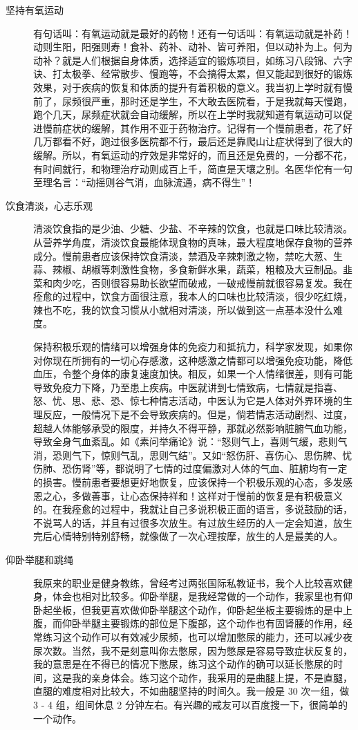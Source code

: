 \begin{description}
    \item[坚持有氧运动] 有句话叫：有氧运动就是最好的药物！还有一句话叫：有氧运动就是补药！动则生阳，阳强则寿！食补、药补、动补、皆可养阳，但以动补为上。何为动补？就是人们根据自身体质，选择适宜的锻炼项目，如练习八段锦、六字诀、打太极拳、经常散步、慢跑等，不会搞得太累，但又能起到很好的锻炼效果，对于疾病的恢复和体质的提升有着积极的意义。我当初上学时就有慢前了，尿频很严重，那时还是学生，不大敢去医院看，于是我就每天慢跑，跑个几天，尿频症状就会自动缓解，所以在上学时我就知道有氧运动可以促进慢前症状的缓解，其作用不亚于药物治疗。记得有一个慢前患者，花了好几万都看不好，跑过很多医院都不行，最后还是靠爬山让症状得到了很大的缓解。所以，有氧运动的疗效是非常好的，而且还是免费的，一分都不花，有时间就行，和物理治疗动则成百上千，简直是天壤之别。名医华佗有一句至理名言：“动摇则谷气消，血脉流通，病不得生”！
    \item[饮食清淡，心志乐观] 清淡饮食指的是少油、少糖、少盐、不辛辣的饮食，也就是口味比较清淡。从营养学角度，清淡饮食最能体现食物的真味，最大程度地保存食物的营养成分。慢前患者应该保持饮食清淡，禁酒及辛辣刺激之物，禁吃大葱、生蒜、辣椒、胡椒等刺激性食物，多食新鲜水果，蔬菜，粗粮及大豆制品。韭菜和肉少吃，否则很容易助长欲望而破戒，一破戒慢前就很容易复发。我在痊愈的过程中，饮食方面很注意，我本人的口味也比较清淡，很少吃红烧，辣也不吃，我的饮食习惯从小就相对清淡，所以做到这一点基本没什么难度。

    保持积极乐观的情绪可以增强身体的免疫力和抵抗力，科学家发现，如果你对你现在所拥有的一切心存感激，这种感激之情都可以增强免疫功能，降低血压，令整个身体的康复速度加快。相反，如果一个人情绪很差，则有可能导致免疫力下降，乃至患上疾病。中医就讲到七情致病，七情就是指喜、怒、忧、思、悲、恐、惊七种情志活动，中医认为它是人体对外界环境的生理反应，一般情况下是不会导致疾病的。但是，倘若情志活动剧烈、过度，超越人体能够承受的限度，并持久不得平静，那就必然影响脏腑气血功能，导致全身气血紊乱。如《素问举痛论》说：“怒则气上，喜则气缓，悲则气消，恐则气下，惊则气乱，思则气结”。又如“怒伤肝、喜伤心、思伤脾、忧伤肺、恐伤肾”等，都说明了七情的过度偏激对人体的气血、脏腑均有一定的损害。慢前患者要想更好地恢复，应该保持一个积极乐观的心态，多发感恩之心，多做善事，让心态保持祥和！这样对于慢前的恢复是有积极意义的。在我痊愈的过程中，我就让自己多说积极正面的语言，多说鼓励的话，不说骂人的话，并且有过很多次放生。有过放生经历的人一定会知道，放生完后心情特别特别舒畅，就像做了一次心理按摩，放生的人是最美的人。
    \item[仰卧举腿和跳绳] 我原来的职业是健身教练，曾经考过两张国际私教证书，我个人比较喜欢健身，体会也相对比较多。仰卧举腿，是我经常做的一个动作，我家里也有仰卧起坐板，但我更喜欢做仰卧举腿这个动作，仰卧起坐板主要锻炼的是中上腹，而仰卧举腿主要锻炼的部位是下腹部，这个动作也有固肾腰的作用，经常练习这个动作可以有效减少尿频，也可以增加憋尿的能力，还可以减少夜尿次数。当然，我不是刻意叫你去憋尿，因为憋尿是容易导致症状反复的，我的意思是在不得已的情况下憋尿，练习这个动作的确可以延长憋尿的时间，这是我的亲身体会。练习这个动作，我采用的是曲腿上提，不是直腿，直腿的难度相对比较大，不如曲腿坚持的时间久。我一般是 30 次一组，做 3 - 4 组，组间休息 2 分钟左右。有兴趣的戒友可以百度搜一下，很简单的一个动作。


\end{description}
